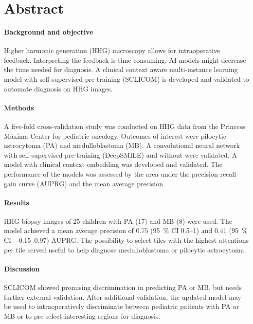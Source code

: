 \section*{Abstract}

\paragraph{Background and objective}
Higher harmonic generation (HHG) microscopy allows for intraoperative feedback.
Interpreting the feedback is time-consuming.
AI models might decrease the time needed for diagnosis.
A clinical context aware multi-instance learning model with self-supervised pre-training (SCLICOM) is developed and validated to automate diagnosis on HHG images.

\paragraph{Methods}
A five-fold cross-validation study was conducted on HHG data from the Princess Máxima Center for pediatric oncology.
Outcomes of interest were pilocytic astrocytoma (PA) and medulloblastoma (MB).
A convolutional neural network with self-supervised pre-training (DeepSMILE) and without were validated.
A model with clinical context embedding was developed and validated.
The performance of the models was assessed by the area under the precision-recall-gain curve (AUPRG) and the mean average precision.

\paragraph{Results}
HHG biopsy images of 25 children with PA (17) and MB (8) were used.
The model achieved a mean average precision of \num{0.75} (\qty{95}{\percent} CI \numrange{0.5}{1}) and \num{0.41} (\qty{95}{\percent} CI \numrange{-0.15}{0.97}) AUPRG.
The possibility to select tiles with the highest attentions per tile served useful to help diagnose medulloblastoma or pilocytic astrocytoma.

\paragraph{Discussion}
SCLICOM showed promising discrimination in predicting PA or MB, but needs further external validation.
After additional validation, the updated model may be used to intraoperatively discriminate between pediatric patients with PA or MB or to pre-select interesting regions for diagnosis.
